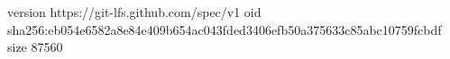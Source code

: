 version https://git-lfs.github.com/spec/v1
oid sha256:eb054e6582a8e84e409b654ac043fded3406efb50a375633c85abc10759fcbdf
size 87560

